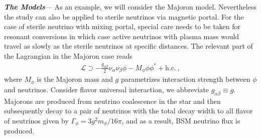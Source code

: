 \textbf{\textit{The Models}}---
As an example, we will consider the Majoron model. Nevertheless the study can also be applied to sterile neutrinos via magnetic portal. For the case of sterile neutrino with mixing portal, special care needs to be taken for resonant conversions in which case active neutrinos with plasma mass would travel as slowly as the sterile neutrinos at specific distances.
The relevant part of the Lagrangian in the Majoron case reads
\begin{align}
\mathcal{L} \supset -\frac{g_{\alpha\beta}}{2} \nu_\alpha \nu_\beta \phi - M_\phi \phi\phi^* + \text{h.c.}\,,
\end{align}
where $M_\phi$ is the Majoron mass and $g$ parametrizes interaction strength between $\phi$ and neutrinos. Consider flavor universal interaction, we abbreviate $g_{\alpha\beta}\equiv g$. Majorons are produced from neutrino coalescence in the star and then subsequently decay to a pair of neutrinos with the total decay width to all flavor of neutrinos given by $\Gamma_\phi = 3g^2 m_\phi/16 \pi$, and as a result, BSM neutrino flux is produced. 

